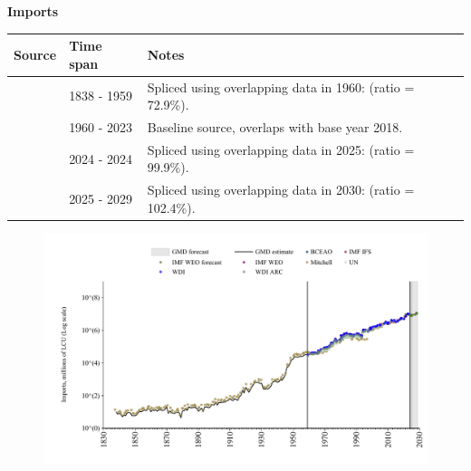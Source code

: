 \documentclass[12pt,a4paper,landscape]{article}
\begin{document}
\begin{adjustbox}{max totalsize={\paperwidth}{\paperheight},center}
\begin{minipage}[t][\textheight][t]{\textwidth}
\vspace*{0.5cm}
{}
\begin{center}
{\Large\bfseries Imports}
\end{center}
\vspace{0.5cm}
\begin{table}[H]
\centering
\small
\begin{tabular}{|l|l|l|}
\hline
\textbf{Source} & \textbf{Time span} & \textbf{Notes} \\
\hline
\rowcolor{white}\cite{Mitchell}& 1838 - 1959 &Spliced using overlapping data in 1960: (ratio = 72.9\%). \\
\rowcolor{lightgray}\cite{WDI}& 1960 - 2023 &Baseline source, overlaps with base year 2018. \\
\rowcolor{white}\cite{BCEAO}& 2024 - 2024 &Spliced using overlapping data in 2025: (ratio = 99.9\%). \\
\rowcolor{lightgray}\cite{IMF_WEO_forecast}& 2025 - 2029 &Spliced using overlapping data in 2030: (ratio = 102.4\%). \\
\hline
\end{tabular}
\end{table}
\begin{figure}[H]
\centering
\includegraphics[width=\textwidth,height=0.6\textheight,keepaspectratio]{graphs/SEN_imports.pdf}
\end{figure}
\end{minipage}
\end{adjustbox}
\end{document}
